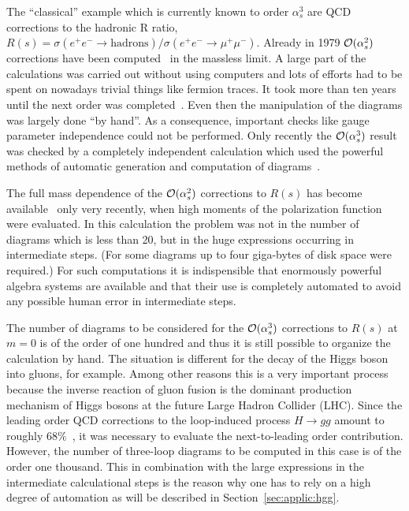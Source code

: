 The ``classical'' example which is currently known to order $\alpha_s^3$
are QCD corrections to the hadronic R ratio,
$R(s)=\sigma(e^+e^-\to\mbox{hadrons})/\sigma(e^+e^-\to\mu^+\mu^-)$.
Already in 1979 ${\cal O}(\alpha_s^2)$ corrections have been
computed~\cite{CheKatTka79DinSap79CelGon80} in the massless limit.  A
large part of the calculations was carried out without using computers
and lots of efforts had to be spent on nowadays trivial things like
fermion traces.  It took more than ten years until the next order was
completed~\cite{GorKatLar91SurSam91,Che97R}.  Even then the manipulation
of the diagrams was largely done ``by hand''. As a consequence,
important checks like gauge parameter independence could not be
performed.  Only recently the ${\cal O}(\alpha_s^3)$ result was checked
by a completely independent calculation which used the powerful methods
of automatic generation and computation of diagrams~\cite{Che97R}.

The full mass dependence of the ${\cal O}(\alpha_s^2)$ corrections to
$R(s)$ has become available~\cite{CheKueSte96} only very recently, when
high moments of the polarization function were evaluated.  In this
calculation the problem was not in the number of diagrams which is less
than 20, but in the huge expressions occurring in intermediate steps.  (For
some diagrams up to four giga-bytes of disk space were required.)  For
such computations it is indispensible that enormously powerful algebra
systems are available and that their use is completely automated to
avoid any possible human error in intermediate steps.

The number of diagrams to be considered for the ${\cal O}(\alpha_s^3)$
corrections to $R(s)$ at $m=0$ is of the order of one hundred and thus
it is still possible to organize the calculation by hand.  The situation
is different for the decay of the Higgs boson into gluons, for example.
Among other reasons this is a very important process because the inverse
reaction of gluon fusion is the dominant production mechanism of Higgs
bosons at the future Large Hadron Collider (LHC). Since the leading
order QCD corrections to the loop-induced process $H\to gg$ amount to
roughly $68\%$~\cite{InaKubOka83,DjoSpiZer91}, it was necessary to
evaluate the next-to-leading order contribution. However, the number of
three-loop diagrams to be computed in this case is of the order one
thousand.  This in combination with the large expressions in the
intermediate calculational steps is the reason why one has to rely on a
high degree of automation as will be described in
Section~\ref{sec:applic:hgg}.

